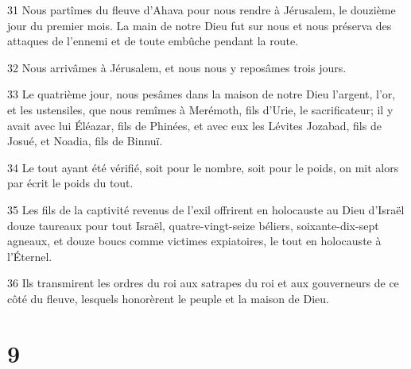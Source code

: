 \par 31 Nous partîmes du fleuve d'Ahava pour nous rendre à Jérusalem, le douzième jour du premier mois. La main de notre Dieu fut sur nous et nous préserva des attaques de l'ennemi et de toute embûche pendant la route.
\par 32 Nous arrivâmes à Jérusalem, et nous nous y reposâmes trois jours.
\par 33 Le quatrième jour, nous pesâmes dans la maison de notre Dieu l'argent, l'or, et les ustensiles, que nous remîmes à Merémoth, fils d'Urie, le sacrificateur; il y avait avec lui Éléazar, fils de Phinées, et avec eux les Lévites Jozabad, fils de Josué, et Noadia, fils de Binnuï.
\par 34 Le tout ayant été vérifié, soit pour le nombre, soit pour le poids, on mit alors par écrit le poids du tout.
\par 35 Les fils de la captivité revenus de l'exil offrirent en holocauste au Dieu d'Israël douze taureaux pour tout Israël, quatre-vingt-seize béliers, soixante-dix-sept agneaux, et douze boucs comme victimes expiatoires, le tout en holocauste à l'Éternel.
\par 36 Ils transmirent les ordres du roi aux satrapes du roi et aux gouverneurs de ce côté du fleuve, lesquels honorèrent le peuple et la maison de Dieu.

\chapter{9}

